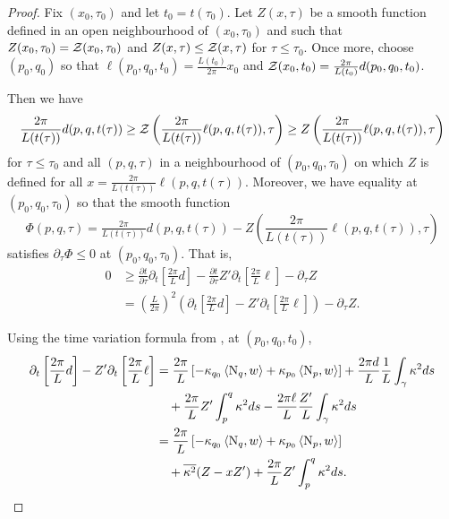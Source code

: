 \documentclass[a4paper, 12pt]{amsart}
\begin{document}
\begin{proof}
Fix $(x_0, \tau_0)$ and let \(t_0 = t(\tau_0)\). Let $Z(x,\tau)$ be a smooth function defined in an open neighbourhood of $(x_0,\tau_0)$ and such that $Z(x_0, \tau_0) = \operatorname{\mathcal{Z}}(x_0, \tau_0)$ and $Z(x, \tau) \leq \operatorname{\mathcal{Z}}(x, \tau)$ for $\tau\leq \tau_0$. Once more, choose $(p_0,q_0)$ so that $\ell(p_0, q_0, t_0) = \frac{L(t_0)}{2\pi} x_0$ and $\operatorname{\mathcal{Z}}(x_0, t_0) = \frac{2\pi}{L(t_0)} d(p_0, q_0, t_0)$.

Then we have
\[
\frac{2\pi}{L(t(\tau))} d(p, q, t(\tau)) \geq \operatorname{\mathcal{Z}}\left(\frac{2\pi}{L(t(\tau))}\ell(p, q, t(\tau)), \tau\right) \geq Z\left(\frac{2\pi}{L(t(\tau))}\ell(p, q, t(\tau)), \tau\right)
\]
for $\tau\leq \tau_0$ and all $(p,q,\tau)$ in a neighbourhood of $(p_0,q_0,\tau_0)$ on which $Z$ is defined for all $x=\frac{2\pi}{L(t(\tau))} \ell(p,q,t(\tau))$. Moreover, we have equality at $(p_0, q_0, \tau_0)$ so that the smooth function
\[
\Phi(p, q, \tau) = \tfrac{2\pi}{L(t(\tau))}d(p,q,t(\tau)) - Z\left(\frac{2\pi}{L(t(\tau))}\ell(p, q, t(\tau)), \tau\right)
\]
satisfies $\partial_{\tau} \Phi \leq 0$ at $(p_0, q_0, \tau_0)$. That is,
\begin{equation}
\label{eq:tau_ineq}
\begin{split}
0 &\geq \frac{\partial t}{\partial \tau} \partial_t \left[\frac{2\pi}{L} d\right] - \frac{\partial t}{\partial \tau} Z' \partial_t \left[\frac{2\pi}{L}\ell\right] - \partial_{\tau} Z \\
&= \left(\frac{L}{2\pi}\right)^2 \left(\partial_t \left[\frac{2\pi}{L} d\right] - Z' \partial_t \left[\frac{2\pi}{L}\ell\right]\right) - \partial_{\tau} Z.
\end{split}
\end{equation}

Using the time variation formula from , at \((p_0, q_0, t_0)\),
\[
\begin{split}
\partial_t \left[\frac{2\pi}{L} d\right] - Z' \partial_t \left[\frac{2\pi}{L}\ell\right] &= \frac{2\pi}{L}\left[-\kappa_{q_0} \left\langle \operatorname{N}_q,w \right\rangle + \kappa_{p_0} \left\langle \operatorname{N}_p,w \right\rangle\right] + \frac{2\pi d}{L} \frac{1}{L} \int_{\gamma} \kappa^2 ds \\
&\quad + \frac{2\pi}{L} Z' \int_p^q \kappa^2 ds - \frac{2\pi\ell}{L} \frac{Z'}{L} \int_{\gamma}\kappa^2 ds \\
&= \frac{2\pi}{L}\left[-\kappa_{q_0} \left\langle \operatorname{N}_q,w \right\rangle + \kappa_{p_0} \left\langle \operatorname{N}_p,w \right\rangle\right] \\
&\quad + \overline{{\kappa^2}} (Z - x Z') + \frac{2\pi}{L} Z' \int_p^q \kappa^2 ds.
\end{split}
\]


\end{proof}
\end{document}

